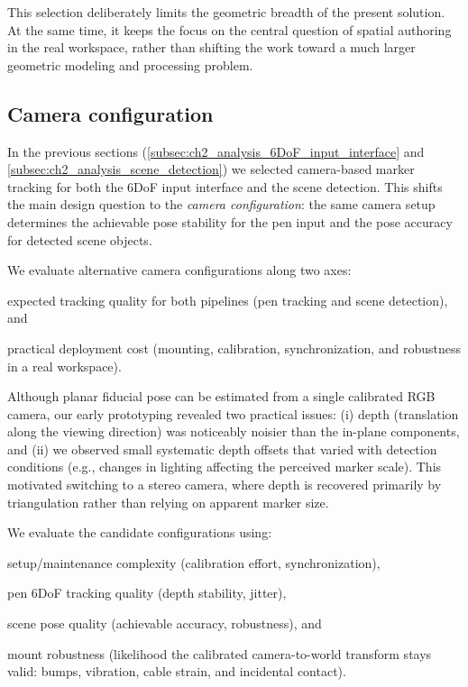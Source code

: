 This selection deliberately limits the geometric breadth of the present solution. At the same time, it keeps the focus on the central question of spatial authoring in the real workspace, rather than shifting the work toward a much larger geometric modeling and processing problem.


\subsection{Camera configuration} \label{subsec:ch2_analysis_camera_tradeoffs}

In the previous sections (\autoref{subsec:ch2_analysis_6DoF_input_interface} and \autoref{subsec:ch2_analysis_scene_detection}) we selected camera-based marker tracking for both the 6DoF input interface and the scene detection. This shifts the main design question to the \emph{camera configuration}: the same camera setup determines the achievable pose stability for the pen input and the pose accuracy for detected scene objects.

We evaluate alternative camera configurations along two axes:
\begin{enumerate*}[label=(\roman*)]
  \item expected tracking quality for both pipelines (pen tracking and scene detection), and
  \item practical deployment cost (mounting, calibration, synchronization, and robustness in a real workspace).
\end{enumerate*}

Although planar fiducial pose can be estimated from a single calibrated RGB camera, our early prototyping revealed two practical issues: (i) depth (translation along the viewing direction) was noticeably noisier than the in-plane components, and (ii) we observed small systematic depth offsets that varied with detection conditions (e.g., changes in lighting affecting the perceived marker scale). This motivated switching to a stereo camera, where depth is recovered primarily by triangulation rather than relying on apparent marker size.

We evaluate the candidate configurations using:
\begin{enumerate*}[label=(\roman*)]
    \item setup/maintenance complexity (calibration effort, synchronization),
    \item pen 6DoF tracking quality (depth stability, jitter),
    \item scene pose quality (achievable accuracy, robustness), and
    \item mount robustness (likelihood the calibrated camera-to-world transform stays valid: bumps, vibration, cable strain, and incidental contact).
\end{enumerate*}

